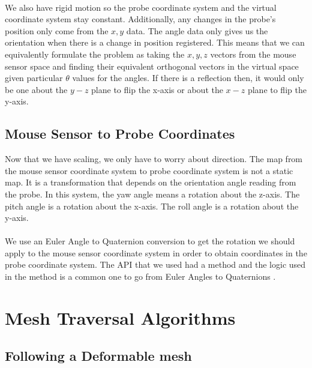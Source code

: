 \documentclass[conference]{acmsiggraph}
\begin{document}
\\
We also have rigid motion so the probe coordinate system and the virtual coordinate system stay constant. Additionally, any changes in the probe's position only come from the $x,y$ data. The angle data only gives us the orientation when there is a change in position registered. This means that we can equivalently formulate the problem as taking the $x,y,z$ vectors from the mouse sensor space and finding their equivalent orthogonal vectors in the virtual space given particular $\theta$ values for the angles. If there is a reflection then, it would only be one about the $y-z$ plane to flip the x-axis or about the $x-z$ plane to flip the y-axis. 

\subsection{Mouse Sensor to Probe Coordinates}

Now that we have scaling, we only have to worry about direction. The map from the mouse sensor coordinate system to probe coordinate system is not a static map. It is a transformation that depends on the orientation angle reading from the probe. In this system, the yaw angle means a rotation about the z-axis. The pitch angle is a rotation about the x-axis. The roll angle is a rotation about the y-axis. \\
\\
We use an Euler Angle to Quaternion conversion to get the rotation we should apply to the mouse sensor coordinate system in order to obtain coordinates in the probe coordinate system. The API that we used had a method \cite{jmonkeyrotation} and the logic used in the method is a common one to go from Euler Angles to Quaternions \cite{quaternionTextboook}.

\section{Mesh Traversal Algorithms}

\subsection{Following a Deformable mesh}
\end{document}
